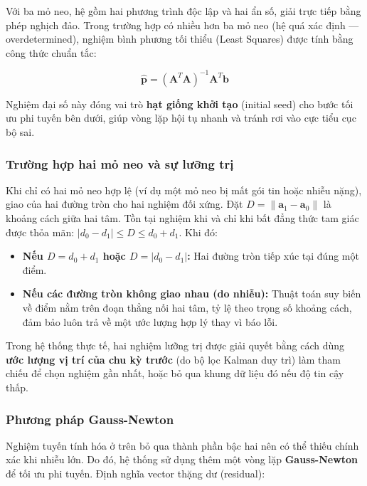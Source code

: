 Với ba mỏ neo, hệ gồm hai phương trình độc lập và hai ẩn số, giải trực tiếp bằng phép nghịch đảo. Trong trường hợp có nhiều hơn ba mỏ neo (hệ quá xác định --- overdetermined), nghiệm bình phương tối thiểu (Least Squares) được tính bằng công thức chuẩn tắc:

\begin{equation}
    \hat{\mathbf{p}} = (\mathbf{A}^T \mathbf{A})^{-1} \mathbf{A}^T \mathbf{b}
\end{equation}

Nghiệm đại số này đóng vai trò \textbf{hạt giống khởi tạo} (initial seed) cho bước tối ưu phi tuyến bên dưới, giúp vòng lặp hội tụ nhanh và tránh rơi vào cực tiểu cục bộ sai.

\subsubsection{Trường hợp hai mỏ neo và sự lưỡng trị}

Khi chỉ có hai mỏ neo hợp lệ (ví dụ một mỏ neo bị mất gói tin hoặc nhiễu nặng), giao của hai đường tròn cho hai nghiệm đối xứng. Đặt $D = \lVert \mathbf{a}_1 - \mathbf{a}_0 \rVert$ là khoảng cách giữa hai tâm. Tồn tại nghiệm khi và chỉ khi bất đẳng thức tam giác được thỏa mãn: $|d_0 - d_1| \le D \le d_0 + d_1$. Khi đó:
\begin{itemize}
    \item \textbf{Nếu $D = d_0 + d_1$ hoặc $D = |d_0 - d_1|$:} Hai đường tròn tiếp xúc tại đúng một điểm.
    \item \textbf{Nếu các đường tròn không giao nhau (do nhiễu):} Thuật toán suy biến về điểm nằm trên đoạn thẳng nối hai tâm, tỷ lệ theo trọng số khoảng cách, đảm bảo luôn trả về một ước lượng hợp lý thay vì báo lỗi.
\end{itemize}

Trong hệ thống thực tế, hai nghiệm lưỡng trị được giải quyết bằng cách dùng \textbf{ước lượng vị trí của chu kỳ trước} (do bộ lọc Kalman duy trì) làm tham chiếu để chọn nghiệm gần nhất, hoặc bỏ qua khung dữ liệu đó nếu độ tin cậy thấp.

\subsubsection{Phương pháp Gauss-Newton}

Nghiệm tuyến tính hóa ở trên bỏ qua thành phần bậc hai nên có thể thiếu chính xác khi nhiễu lớn. Do đó, hệ thống sử dụng thêm một vòng lặp \textbf{Gauss-Newton} để tối ưu phi tuyến. Định nghĩa vector thặng dư (residual):


